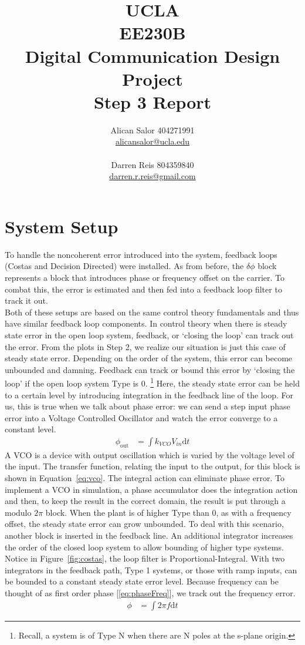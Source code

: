 \documentclass[]{article}
\title{UCLA\\EE230B\\Digital Communication Design Project\\Step 3 Report}
\author{Alican Salor 404271991 \\  \href{mailto:alicansalor@ucla.edu}{alicansalor@ucla.edu} \\ \\
Darren Reis 804359840 \\
\href{mailto:darrer.r.reis@gmail.com}{darren.r.reis@gmail.com} }
\begin{document}
\maketitle

\newpage
\tableofcontents

\newpage


\section{System Setup}
\label{sec:setup}
To handle the noncoherent error introduced into the system, feedback loops (Costas and Decision Directed) were installed.  As from before, the $\delta\phi$ block represents a block that introduces phase or frequency offset on the carrier.  To combat this, the error is estimated and then fed into a feedback loop filter to track it out. \\

Both of these setups are based on the same control theory fundamentals and thus have similar feedback loop components. In control theory when there is steady state error in the open loop system, feedback, or `closing the loop' can track out the error.  From the plots in Step 2, we realize our situation is just this case of steady state error.  Depending on the order of the system, this error can become unbounded and damning.  Feedback can track or bound this error by `closing the loop' if the open loop system Type is 0.  \footnote{Recall, a system is of Type N when there are N poles at the s-plane origin.}  Here, the steady state error can be held to a certain level by introducing integration in the feedback line of the loop.  For us, this is true when we talk about phase error: we can send a step input phase error into a Voltage Controlled Oscillator and watch the error converge to a constant level. 
\begin{align}
\label{eq:vco}
\phi_{\text{out}} &= \int \! k_{VCO}V_{in} \mathrm{d}t
\end{align}
A VCO is a device with output oscillation which is varied by the voltage level of the input.  The transfer function, relating the input to the output, for this block is shown in Equation~\ref{eq:vco}. The integral action can eliminate phase error. To implement a VCO in simulation, a phase accumulator does the integration   action and then, to keep the result in the correct domain, the result is put through a modulo $2\pi$ block.   
When the plant is of higher Type than 0, as with a frequency offset, the steady state error can grow unbounded.  To deal with this scenario, another block is inserted in the feedback line.  An additional integrator increases the order of the closed loop system to allow bounding of higher type systems.  Notice in Figure~\ref{fig:costas}, the loop filter is Proportional-Integral.  With two integrators in the feedback path, Type 1 systems, or those with ramp inputs, can be bounded to a constant steady state error level.  Because frequency can be thought of as first order phase [\ref{eq:phaseFreq}], we track out the frequency error.\\
\begin{align}
\label{eq:phaseFreq}
\phi &= \int \! 2\pi f \mathrm{d}t 
\end{align}
\end{document}

